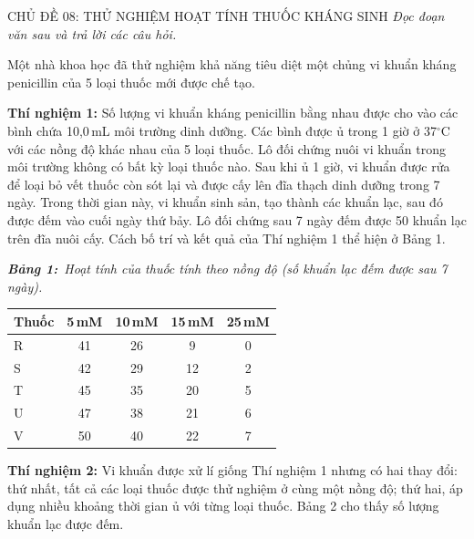\documentclass[12pt,a4paper,twoside]{article}
\newcommand{\tablecaption}[2]{%
    \par\vspace{2pt}%
    {\centering\textbf{\textit{Bảng #1:}}~\textit{#2}\par}%
    \vspace{0pt}%
}
\newenvironment{readingpassage}[1][]{%
    \begin{tcolorbox}[enhanced, colback=grayLight, colframe=secondaryBlue,
        coltitle=textDark, fonttitle=\bfseries, title={#1},
        rounded corners, arc=3mm, boxrule=1pt,
        left=15pt, right=15pt, top=10pt, bottom=10pt,
        breakable, before skip=10pt, after skip=10pt, drop fuzzy shadow]
    \setstretch{1.3}
}{\end{tcolorbox}}
\begin{document}
\label{b1_cd08}
\begin{topicbox}{\large CHỦ ĐỀ 08: THỬ NGHIỆM HOẠT TÍNH THUỐC KHÁNG SINH}
\vspace{8pt}
\textit{Đọc đoạn văn sau và trả lời các câu hỏi.}
\vspace{6pt}
\end{topicbox}
\vspace{5pt}
\begin{readingpassage}[]
Một nhà khoa học đã thử nghiệm khả năng tiêu diệt một chủng vi khuẩn kháng penicillin của 5 loại thuốc mới được chế tạo.

\textbf{Thí nghiệm 1:} Số lượng vi khuẩn kháng penicillin bằng nhau được cho vào các bình chứa 10,0\,mL môi trường dinh dưỡng. Các bình được ủ trong 1 giờ ở 37$^{\circ}$C với các nồng độ khác nhau của 5 loại thuốc. Lô đối chứng nuôi vi khuẩn trong môi trường không có bất kỳ loại thuốc nào. Sau khi ủ 1 giờ, vi khuẩn được rửa để loại bỏ vết thuốc còn sót lại và được cấy lên đĩa thạch dinh dưỡng trong 7 ngày. Trong thời gian này, vi khuẩn sinh sản, tạo thành các khuẩn lạc, sau đó được đếm vào cuối ngày thứ bảy. Lô đối chứng sau 7 ngày đếm được 50 khuẩn lạc trên đĩa nuôi cấy. Cách bố trí và kết quả của Thí nghiệm 1 thể hiện ở Bảng 1.

\tablecaption{1}{Hoạt tính của thuốc tính theo nồng độ (số khuẩn lạc đếm được sau 7 ngày).}
\renewcommand{\arraystretch}{1.3}
{\small
{}%
\begin{center}
\begin{tabular}{|l|c|c|c|c|}
\hline
\rowcolor{primaryBlue!12}
\textbf{Thuốc} & \textbf{5\,mM} & \textbf{10\,mM} & \textbf{15\,mM} & \textbf{25\,mM} \\
\hline
R & 41 & 26 & 9 & 0 \\
\hline
S & 42 & 29 & 12 & 2 \\
\hline
T & 45 & 35 & 20 & 5 \\
\hline
U & 47 & 38 & 21 & 6 \\
\hline
V & 50 & 40 & 22 & 7 \\
\hline
\end{tabular}
\end{center}
}

\vspace{6pt}
\textbf{Thí nghiệm 2:} Vi khuẩn được xử lí giống Thí nghiệm 1 nhưng có hai thay đổi: thứ nhất, tất cả các loại thuốc được thử nghiệm ở cùng một nồng độ; thứ hai, áp dụng nhiều khoảng thời gian ủ với từng loại thuốc. Bảng 2 cho thấy số lượng khuẩn lạc được đếm.


\end{readingpassage}
\end{document}
